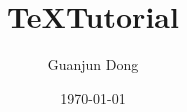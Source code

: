 \documentclass[11pt]{article}
\title{\TeX Tutorial}
\author{Guanjun Dong}
\date{\today}
\begin{document}
\begin{CJK}{UTF8}{song}

\maketitle

\newpage
\tableofcontents 

\newpage
{}
\listoffigures 

\newpage
\listoftables

\newpage
\newpage
\newpage
\newpage
\newpage

\end{CJK}
\end{document}
